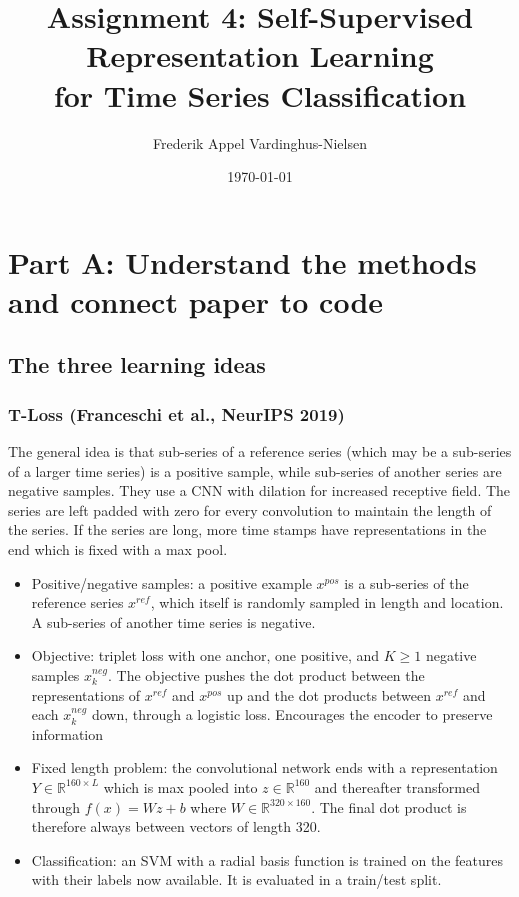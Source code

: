 \documentclass[a4paper,11pt]{article}
\title{Assignment 4: Self-Supervised Representation Learning\\ for Time Series Classification}
\author{Frederik Appel Vardinghus-Nielsen}
\date{\today}
\begin{document}
\maketitle
\tableofcontents
\newpage

\section{Part A: Understand the methods and connect paper to code}

\subsection{The three learning ideas}

\subsubsection{T-Loss (Franceschi et al., NeurIPS 2019)}
The general idea is that sub-series of a reference series (which may be a sub-series of a larger time series) is a positive sample, while sub-series of another series are negative samples. They use a CNN with dilation for increased receptive field. The series are left padded with zero for every convolution to maintain the length of the series. If the series are long, more time stamps have representations in the end which is fixed with a max pool.

\begin{itemize}
\item Positive/negative samples: a positive example $x^{pos}$ is a sub-series of the reference series $x^{ref}$, which itself is randomly sampled in length and location. A sub-series of another time series is negative.
\item Objective: triplet loss with one anchor, one positive, and $K\geq1$ negative samples $x_{k}^{neg}$. The objective pushes the dot product between the representations of $x^{ref}$ and $x^{pos}$ up and the dot products between $x^{ref}$ and each $x_k^{neg}$ down, through a logistic loss. Encourages the encoder to preserve information
\item Fixed length problem: the convolutional network ends with a representation $Y\in\mathbb{R}^{160 \times L}$ which is max pooled into $z\in\mathbb{R}^{160}$ and thereafter transformed through $f(x)=Wz+b$ where $W\in\mathbb{R}^{320\times160}$. The final dot product is therefore always between vectors of length 320.
\item Classification: an SVM with a radial basis function is trained on the features with their labels now available. It is evaluated in a train/test split.
\end{itemize}
\end{document}
